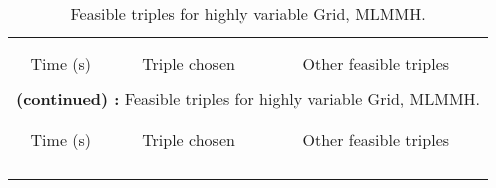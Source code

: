 \begin{center}
	\begin{longtable}{ccc}
		\caption[Feasible triples for a highly variable Grid]{Feasible triples
			for highly variable Grid, MLMMH.} \label{Table2.6} \vspace{-1.75mm}\\
		\hline\\[-2.45ex] \hline \\[-1.8ex] %
		\multicolumn{1}{c}{{Time (s)}} &
		\multicolumn{1}{c}{{Triple chosen}} &
		\multicolumn{1}{c}{{Other feasible triples}} \\[0.5ex] \hline
		\\[-1.8ex]
		\endfirsthead
		
		\multicolumn{3}{c}{{\tablename} \textbf{\thetable{}} \textbf{(continued) :} Feasible triples
			for highly variable Grid, MLMMH.} \\[0.5ex]
		\hline\\[-2.45ex] \hline \\[-1.8ex]
		\multicolumn{1}{c}{{Time (s)}} &
		\multicolumn{1}{c}{{Triple chosen}} &
		\multicolumn{1}{c}{{Other feasible triples}} \\[0.5ex] \hline
		\\[-1.8ex]
		\endhead
		
		\\[-1.8ex] \hline
		\endfoot
		
		\\[-1.8ex] \hline
		\endlastfoot
		

\end{longtable}
\end{center}
